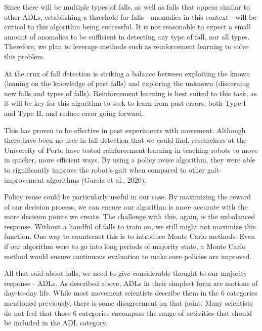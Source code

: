 \documentclass{llncs}
\begin{document}
	Since there will be multiple types of falls, as well as falls that appear similar to other ADLs, establishing a threshold for falls - anomalies in this context - will be critical to this algorithm being successful. It is not reasonable to expect a small amount of anomalies to be sufficient in detecting any type of fall, nor all types. Therefore, we plan to leverage methods such as reinforcement learning to solve this problem.
	
	At the crux of fall detection is striking a balance between exploiting the known (leaning on the knowledge of past falls) and exploring the unknown (discerning new falls and types of falls). Reinforcement learning is best suited to this task, as it will be key for this algorithm to seek to learn from past errors, both Type I and Type II, and reduce error going forward.
	
	This has proven to be effective in past experiments with movement. Although there have been no uses in fall detection that we could find, researchers at the University of Porto have tested reinforcement learning in teaching robots to move in quicker, more efficient ways. By using a policy reuse algorithm, they were able to significantly improve the robot's gait when compared to other gait-improvement algorithms (Garcia et al., 2020).\cite{garcia2020teaching}
	
	Policy reuse could be particularly useful in our case. By maximizing the reward of our decision process, we can ensure our algorithm is more accurate with the more decision points we create. The challenge with this, again, is the unbalanced response. Without a handful of falls to train on, we still might not maximize this function. One way to counteract this is to introduce Monte Carlo methods. Even if our algorithm were to go into long periods of majority state, a Monte Carlo method would ensure continuous evaluation to make sure policies are improved.
	
	All that said about falls, we need to give considerable thought to our majority response - ADLs. As described above, ADLs in their simplest form are motions of day-to-day life. While most movement scientists describe them in the 6 categories mentioned previously, there is some disagreement on that point. Many scientists do not feel that those 6 categories encompass the range of activities that should be included in the ADL category.
	
\end{document}
